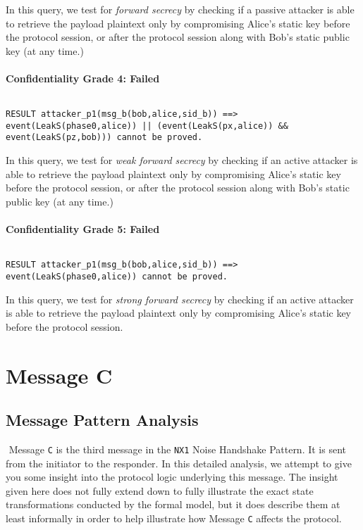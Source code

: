 In this query, we test for \emph{forward secrecy} by checking if a passive attacker is able to retrieve the payload plaintext only by compromising Alice's static key before the protocol session, or after the protocol session along with Bob's static public key (at any time.)


\paragraph{Confidentiality Grade 4: Failed}$ $
\begin{lstlisting}
RESULT attacker_p1(msg_b(bob,alice,sid_b)) ==> event(LeakS(phase0,alice)) || (event(LeakS(px,alice)) && event(LeakS(pz,bob))) cannot be proved.
\end{lstlisting}

In this query, we test for \emph{weak forward secrecy} by checking if an active attacker is able to retrieve the payload plaintext only by compromising Alice's static key before the protocol session, or after the protocol session along with Bob's static public key (at any time.)


\paragraph{Confidentiality Grade 5: Failed}$ $
\begin{lstlisting}
RESULT attacker_p1(msg_b(bob,alice,sid_b)) ==> event(LeakS(phase0,alice)) cannot be proved.
\end{lstlisting}

In this query, we test for \emph{strong forward secrecy} by checking if an active attacker is able to retrieve the payload plaintext only by compromising Alice's static key before the protocol session.


\section{ Message C}

\subsection{Message Pattern Analysis}$ $
Message \texttt{C} is the third message in the \texttt{NX1} Noise Handshake Pattern. It is sent from the initiator to the responder. In this detailed analysis, we attempt to give you some insight into the protocol logic underlying this message. The insight given here does not fully extend down to fully illustrate the exact state transformations conducted by the formal model, but it does describe them at least informally in order to help illustrate how Message \texttt{C} affects the protocol.



